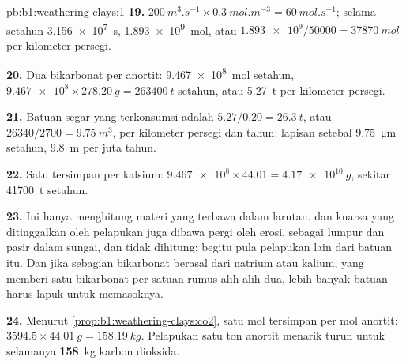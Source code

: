 \begin{solution}{pb:b1:weathering-clays:1}
\textbf{19.} $\qty{200}{m^3.s^{-1}} \times \qty{0.3}{mol.m^{-3}} =
\qty{60}{mol.s^{-1}}$; selama setahun \qty{3.156e7}{s}, \qty{1.893e9}{mol}, atau
$\num{1.893e9}/\num{50000} = \qty{37870}{mol}$ per kilometer persegi.

\textbf{20.} Dua bikarbonat per anortit: \qty{9.467e8}{mol} setahun,
$\num{9.467e8}\times\qty{278.20}{g} = \qty{263400}{t}$ setahun, atau
\qty{5.27}{t} per kilometer persegi.

\textbf{21.} Batuan segar yang terkonsumsi adalah $5.27/0.20 = \qty{26.3}{t}$, atau
$\num{26340}/2700 = \qty{9.75}{m^3}$, per kilometer persegi dan tahun: lapisan
setebal \qty{9.75}{\micro m} setahun, \qty{9.8}{m} per juta tahun.

\textbf{22.} Satu  tersimpan per kalsium: $\num{9.467e8} \times 44.01 =
\qty{4.17e10}{g}$, sekitar \qty{41700}{t} setahun.

\textbf{23.} Ini hanya menghitung materi yang terbawa dalam larutan.  dan
kuarsa yang ditinggalkan oleh pelapukan juga dibawa pergi oleh erosi, sebagai
lumpur dan pasir dalam sungai, dan tidak dihitung; begitu pula pelapukan 
lain dari batuan itu. Dan jika sebagian bikarbonat berasal dari  natrium
atau kalium, yang memberi satu bikarbonat per satuan rumus alih-alih dua, lebih
banyak batuan harus lapuk untuk memasoknya.

\textbf{24.} Menurut \cref{prop:b1:weathering-clays:co2}, satu mol  tersimpan
per mol anortit: $3594.5 \times \qty{44.01}{g} = \qty{158.19}{kg}$.
Pelapukan satu ton anortit menarik turun untuk selamanya
\textbf{158}~kg karbon dioksida.
\end{solution}
